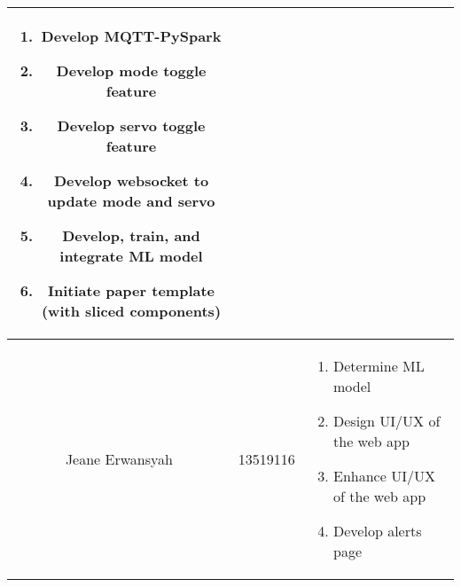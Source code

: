 \begin{table}[htbp]
\begin{center}
\begin{tabular}{|c|c|p{3cm}|}
\begin{enumerate}[leftmargin=*]
				                                         \item Develop MQTT-PySpark
				                                         \item Develop mode toggle feature
				                                         \item Develop servo toggle feature
				                                         \item Develop websocket to update mode and servo
				                                         \item Develop, train, and integrate ML model
				                                         \item Initiate paper template (with sliced components)
			                                         \end{enumerate}
			\\
			\hline
			Jeane Erwansyah  & 13519116            & \begin{enumerate}[leftmargin=*]
				                                         \item Determine ML model
				                                         \item Design UI/UX of the web app
				                                         \item Enhance UI/UX of the web app
				                                         \item Develop alerts page
			                                         \end{enumerate}
			\\
			\hline
		\end{tabular}
		\label{tab-divsion-of-task}
	\end{center}
\end{table}